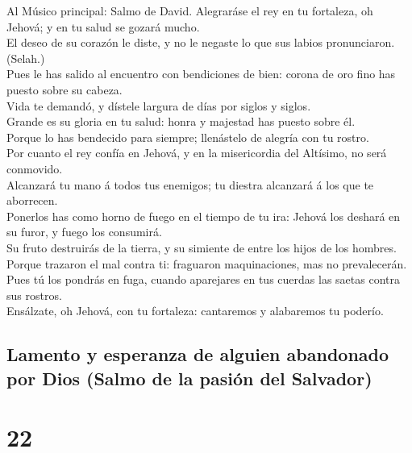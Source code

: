  Al Músico principal: Salmo de David. Alegraráse el rey en
tu fortaleza, oh Jehová; y en tu salud se gozará mucho.\\
 El deseo de su corazón le diste, y no le negaste lo que
sus labios pronunciaron. (Selah.)\\
 Pues le has salido al encuentro con bendiciones de bien:
corona de oro fino has puesto sobre su cabeza.\\
 Vida te demandó, y dístele largura de días por siglos y
siglos.\\
 Grande es su gloria en tu salud: honra y majestad has
puesto sobre él.\\
 Porque lo has bendecido para siempre; llenástelo de
alegría con tu rostro.\\
 Por cuanto el rey confía en Jehová, y en la misericordia
del Altísimo, no será conmovido.\\
 Alcanzará tu mano á todos tus enemigos; tu diestra
alcanzará á los que te aborrecen.\\
 Ponerlos has como horno de fuego en el tiempo de tu ira:
Jehová los deshará en su furor, y fuego los consumirá.\\
 Su fruto destruirás de la tierra, y su simiente de entre
los hijos de los hombres.\\
 Porque trazaron el mal contra ti: fraguaron
maquinaciones, mas no prevalecerán.\\
 Pues tú los pondrás en fuga, cuando aparejares en tus
cuerdas las saetas contra sus rostros.\\
 Ensálzate, oh Jehová, con tu fortaleza: cantaremos y
alabaremos tu poderío.

\hypertarget{lamento-y-esperanza-de-alguien-abandonado-por-dios-salmo-de-la-pasiuxf3n-del-salvador}{%
\subsection{Lamento y esperanza de alguien abandonado por Dios (Salmo de
la pasión del
Salvador)}\label{lamento-y-esperanza-de-alguien-abandonado-por-dios-salmo-de-la-pasiuxf3n-del-salvador}}

\hypertarget{section-21}{%
\section{22}\label{section-21}}

